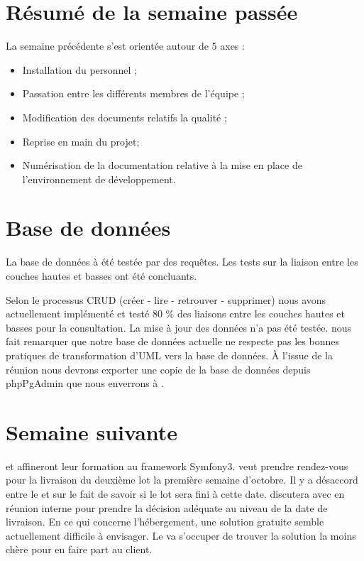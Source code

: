 \documentclass [a4paper] {article}
\begin{document}
\section{Résumé de la semaine passée}
La semaine précédente s'est orientée autour de 5 axes :  
\begin{itemize}
\item Installation du personnel ;
\item Passation entre les différents membres de l'équipe ;
\item Modification des documents relatifs la qualité ;
\item Reprise en main du projet;
\item Numérisation de la documentation relative à la mise en place de l'environnement de développement.
\end{itemize} 

\section{Base de données}
La base de données à été testée par des requêtes. Les tests sur la liaison entre les couches hautes et basses ont été concluants. 

Selon le processus CRUD (créer - lire - retrouver - supprimer) nous avons actuellement implémenté et testé 80 \% des liaisons entre les couches hautes et basses pour la consultation. La mise à jour des données n'a pas été testée. \nomTuteurPedago{} nous fait remarquer que notre base de données actuelle ne respecte pas les bonnes pratiques de transformation d'UML vers la base de données. 
À l'issue de la réunion nous devrons exporter une copie de la base de données depuis phpPgAdmin que nous enverrons à \nomTuteurPedago{}.

\section{Semaine suivante}
\Francois{} et \Juliana{} affineront leur formation au framework Symfony3. 
\Pierre{} veut prendre rendez-vous pour la livraison du deuxième lot la première semaine d'octobre. Il y a désaccord entre le \RD{} et \Pierre{} sur le fait de savoir si le lot sera fini à cette date. \Pierre{} discutera avec \Julie{} en réunion interne pour prendre la décision adéquate au niveau de la date de livraison. En ce qui concerne l'hébergement, une solution gratuite semble actuellement difficile à envisager. Le \CP{} va s'occuper de trouver la solution la moins chère pour en faire part au client.
\end{document}

